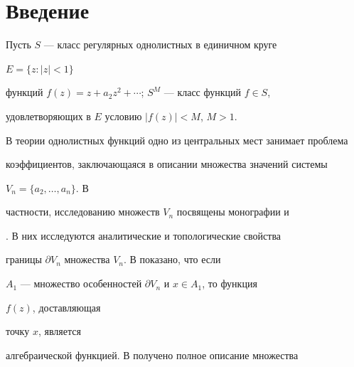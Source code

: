\date{}







\pagestyle{plain} %













\maketitle


\label{begin}





\section*{Введение}





Пусть $S$ --- класс регулярных однолистных в единичном круге


$E=\{z:|z|<1\}$


функций $f(z)=z+a_2z^2+\dotsb$; $S^M$ --- класс функций $f\in S$,


удовлетворяющих в $E$ условию $|f(z)|<M$, $M>1$.





В теории однолистных функций одно из центральных мест занимает проблема


коэффициентов, заключающаяся в описании множества значений системы


$V_n=\{a_2,\dotsc,a_n\}$. В


частности, исследованию множеств $V_n$ посвящены монографии \cite{1} и


\cite{2}. В них исследуются аналитические и топологические свойства


границы $\partial V_n$ множества $V_n$. В \cite{1} показано, что если


$A_1$ --- множество особенностей $\partial V_n$ и $x\in A_1$, то функция


$f(z)$, доставляющая


точку $x$, является


алгебраической функцией. В \cite{2} получено полное описание множества


